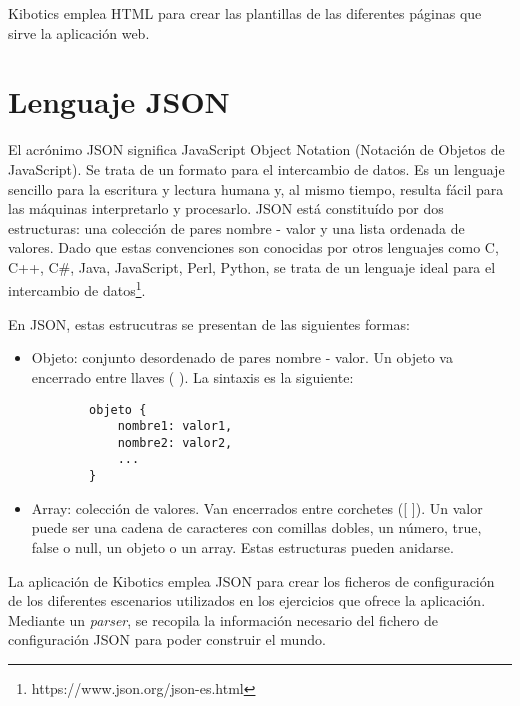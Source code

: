Kibotics emplea HTML para crear las plantillas de las diferentes páginas que sirve la aplicación web.

\section{Lenguaje JSON}
El acrónimo JSON significa JavaScript Object Notation (Notación de Objetos de JavaScript). Se trata de un formato para el intercambio de datos. Es un lenguaje sencillo para la escritura y lectura humana y, al mismo tiempo, resulta fácil para las máquinas interpretarlo y procesarlo. JSON está constituído por dos estructuras: una colección de pares nombre - valor y una lista ordenada de valores. Dado que estas convenciones son conocidas por otros lenguajes como  C, C++, C#, Java, JavaScript, Perl, Python, se trata de un lenguaje ideal para el intercambio de datos\footnote{https://www.json.org/json-es.html}. \newline

En JSON, estas estrucutras se presentan de las siguientes formas:
\begin{itemize}
    \item Objeto: conjunto desordenado de pares nombre - valor. Un objeto va encerrado entre llaves ({ }). La sintaxis es la siguiente: 
    \begin{verbatim}
        objeto {
            nombre1: valor1,
            nombre2: valor2,
            ...
        }
    \end{verbatim}
    \item Array: colección de valores. Van encerrados entre corchetes ([ ]). Un valor puede ser una cadena de caracteres con comillas dobles, un número, true, false o null, un objeto o un array. Estas estructuras pueden anidarse.

\end{itemize}

La aplicación de Kibotics emplea JSON para crear los ficheros de configuración de los diferentes escenarios utilizados en los ejercicios que ofrece la aplicación. Mediante un \textit{parser}, se recopila la información necesario del fichero de configuración JSON para poder construir el mundo.

